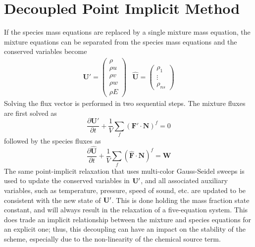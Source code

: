 \section{Decoupled Point Implicit Method}

If the species mass equations are replaced by a single mixture mass equation,
the mixture equations can be separated from the species mass
equations and the conserved variables become
\begin{equation}
	\begin{matrix}
		\mathbf{U}'=\begin{pmatrix}
			\rho \\
			\rho u \\
			\rho v \\
			\rho w \\
			\rho E
		\end{pmatrix} &
		\mathbf{\hat{U}}=\begin{pmatrix}
			\rho_1 \\
			\vdots \\
			\rho_{ns}
		\end{pmatrix}
	\end{matrix}
  \label{dc-variables}
\end{equation}
Solving the flux vector is performed in two sequential steps.  The mixture
fluxes are first solved as
\begin{equation}
  \frac{\partial \mathbf{{U}'}}{\partial t} +
  \frac{1}{V}\sum\limits_{f}(\mathbf{F}'\cdot\mathbf{N})^f = 0
\end{equation}
followed by the species fluxes as
\begin{equation}
  \frac{\partial \mathbf{\hat{U}}}{\partial t} +
  \frac{1}{V}\sum\limits_{f}(\mathbf{\hat{F}}\cdot\mathbf{N})^f =
  \mathbf{\hat{W}}
\end{equation}
The same point-implicit relaxation that uses multi-color Gauss-Seidel sweeps is
used to update the conserved variables in $\mathbf U '$, and all associated
auxiliary variables, such as temperature, pressure, speed of sound, etc. are
updated to be consistent with the new state of $\mathbf U '$.  This is done holding
the mass fraction state constant, and will always result in the relaxation of
a five-equation system.  This does trade an implicit relationship between the
mixture and species equations for an explicit one; thus, this decoupling can
have an impact on the stability of the scheme, especially due to the
non-linearity of the chemical source term\cite{park}.
 
